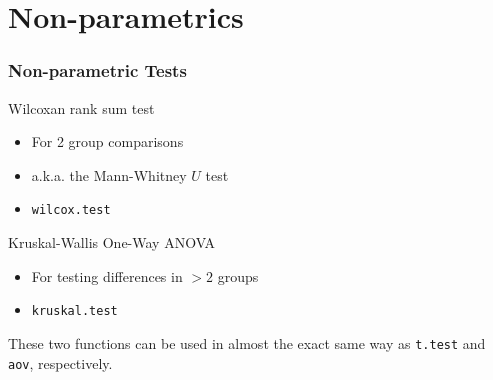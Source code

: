 \documentclass[color=usenames,dvipsnames]{beamer}\usepackage[]{graphicx}\usepackage[]{color}
\newcommand{\inr}[1]{\colorbox{inlinecolor}{\texttt{#1}}}
\begin{document}








\section{Non-parametrics}






\begin{frame}[fragile]
  \frametitle{Non-parametric Tests}
  \large
  {Wilcoxan rank sum test}
  \begin{itemize}
    \item For 2 group comparisons
    \item a.k.a. the Mann-Whitney $U$ test
    \item \inr{wilcox.test}
  \end{itemize}
  \pause
  \vspace{0.5cm}
  {Kruskal-Wallis One-Way ANOVA}
  \begin{itemize}
    \item For testing differences in $>2$ groups
    \item \inr{kruskal.test}
  \end{itemize}
\pause
\vfill
\centering
These two functions can be used in almost the exact same way as
\inr{t.test} and \inr{aov}, respectively. \\
\end{frame}
\end{document}
